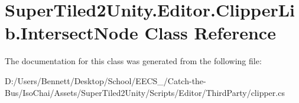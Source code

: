\hypertarget{class_super_tiled2_unity_1_1_editor_1_1_clipper_lib_1_1_intersect_node}{}\section{Super\+Tiled2\+Unity.\+Editor.\+Clipper\+Lib.\+Intersect\+Node Class Reference}
\label{class_super_tiled2_unity_1_1_editor_1_1_clipper_lib_1_1_intersect_node}


The documentation for this class was generated from the following file\+:\begin{DoxyCompactItemize}
\item 
D\+:/\+Users/\+Bennett/\+Desktop/\+School/\+E\+E\+C\+S\+\_/\+Catch-\/the-\/\+Bus/\+Iso\+Chai/\+Assets/\+Super\+Tiled2\+Unity/\+Scripts/\+Editor/\+Third\+Party/clipper.\+cs\end{DoxyCompactItemize}
